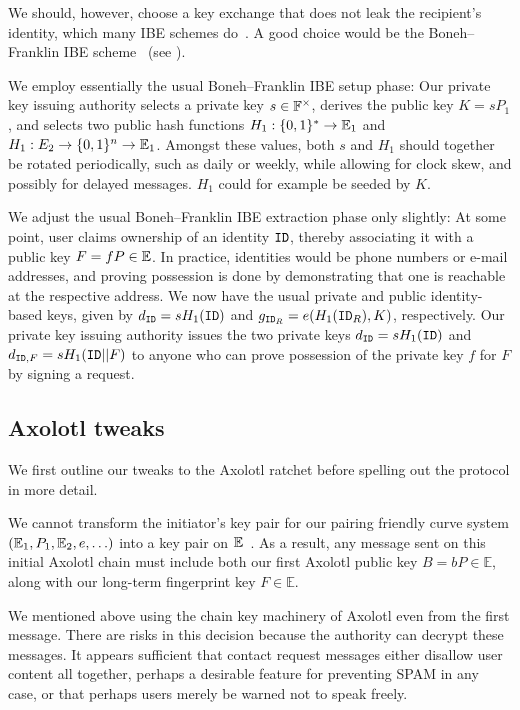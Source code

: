 \documentclass[twoside,letterpaper]{sig-alternate}
\begin{document}
We should, however, choose a key exchange that does not leak the recipient's
identity, which many IBE schemes do~\cite{AnonIBE}.
A good choice would be the Boneh–Franklin IBE scheme~\cite{BF-IBE}
(see \cite[??]{BoyenMIBS}).

We employ essentially the usual Boneh–Franklin IBE setup phase:
Our private key issuing authority
 selects a private key $s \in \mathbb{F}^\times$,
 derives the public key $K = s P_1$, and
 selects two public hash functions
  $H_1 : \{0,1\}^* \to \mathbb{E}_1$ and $H_1 : E_2 \to \{0,1\}^n \to \mathbb{E}_1$.
Amongst these values, both $s$ and $H_1$ should together be rotated
 periodically, such as daily or weekly,
while allowing for clock skew, and possibly for delayed messages.
$H_1$ could for example be seeded by $K$.

We adjust the usual Boneh–Franklin IBE extraction phase only slightly:
At some point, user claims ownership of an identity $\mathtt{ID}$, thereby
 associating it with a public key $F = f P \in \mathbb{E}$.
In practice, identities would be phone numbers or e-mail addresses,
and proving possession is done by demonstrating that
one is reachable at the respective address.
We now have the usual private and public identity-based keys, given by
 $d_{\mathtt{ID}} = s H_1(\mathtt{ID})$ and $g_{\mathtt{ID}_R} = e(H_1(\mathtt{ID}_R),K)$, respectively.
Our private key issuing authority issues the two private keys
 $d_{\mathtt{ID}} = s H_1(\mathtt{ID})$ and $d_{\mathtt{ID},F} = s H_1(\mathtt{ID} || F)$
to anyone who can prove possession of the private key $f$ for $F$
 by signing a request. 

\subsection{Axolotl tweaks} %

We first outline our tweaks to the Axolotl ratchet before
 spelling out the protocol in more detail.

We cannot transform the initiator's key pair for
 our pairing friendly curve system $(\mathbb{E}_1,P_1,\mathbb{E}_2,e,\ldots)$
into a key pair on $\mathbb{E}$~\cite{??no_homomorphism??}.
As a result, any message sent on this initial Axolotl chain must include
both our first Axolotl public key $B = b P \in \mathbb{E}$,
 along with our long-term fingerprint key $F \in \mathbb{E}$.

We mentioned above using the chain key machinery of Axolotl even from
the first message.  There are risks in this decision because the
authority can decrypt these messages.  It appears sufficient that
contact request messages either disallow user content all together,
perhaps a desirable feature for preventing SPAM in any case, or that
perhaps users merely be warned not to speak freely.
\end{document}
